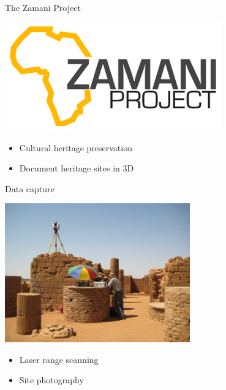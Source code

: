 \documentclass[compress]{beamer}
\begin{document}
\begin{frame}{The Zamani Project}

  \includegraphics[width=0.70\textwidth]{pics/Zamani_logo}

  \begin{itemize}
  \item Cultural heritage preservation
  \item Document heritage sites in 3D 
  \end{itemize}
\end{frame}

\begin{frame}{Data capture}

  \includegraphics[width=0.60\textwidth]{pics/scanning.jpg}
    \begin{itemize}
  \item
    Laser range scanning
  \item
    Site photography
  \end{itemize}
\end{frame}
\end{document}
